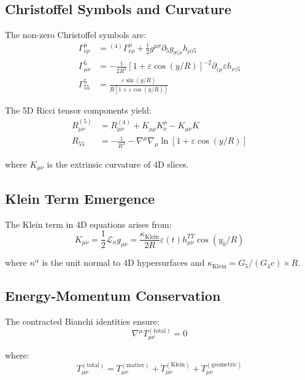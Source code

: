 \documentclass[12pt]{iopart}
\begin{document}
\subsection{Christoffel Symbols and Curvature}

The non-zero Christoffel symbols are:
\begin{align}
\Gamma^\mu_{\nu\rho} &= {}^{(4)}\Gamma^\mu_{\nu\rho} + \frac{1}{2}g^{\mu\sigma}\partial_5 g_{\sigma(\nu}h_{\rho)5}\\
\Gamma^5_{\mu\nu} &= -\frac{1}{2R^2}[1 + \varepsilon\cos(y/R)]^{-2}\partial_{(\mu}\varepsilon h_{\nu)5}\\
\Gamma^5_{55} &= \frac{\varepsilon\sin(y/R)}{R[1 + \varepsilon\cos(y/R)]}
\end{align}

The 5D Ricci tensor components yield:
\begin{align}
R_{\mu\nu}^{(5)} &= R_{\mu\nu}^{(4)} + K_{\mu\rho}K^\rho_\nu - K_{\mu\nu}K\\
R_{55} &= -\frac{1}{R^2} - \nabla^\mu\nabla_\mu\ln[1 + \varepsilon\cos(y/R)]
\end{align}

where $K_{\mu\nu}$ is the extrinsic curvature of 4D slices.

\subsection{Klein Term Emergence}

The Klein term in 4D equations arises from:
\begin{equation}
K_{\mu\nu} = \frac{1}{2}\mathcal{L}_n g_{\mu\nu} = \frac{\kappa_{\text{Klein}}}{2R}\varepsilon(t) h_{\mu\nu}^{TT}\cos(y_0/R)
\end{equation}

where $n^\alpha$ is the unit normal to 4D hypersurfaces and $\kappa_{\text{Klein}} = G_5/(G_4 c) \times R$.

\subsection{Energy-Momentum Conservation}

The contracted Bianchi identities ensure:
\begin{equation}
\nabla^\mu T_{\mu\nu}^{(\text{total})} = 0
\end{equation}

where:
\begin{equation}
T_{\mu\nu}^{(\text{total})} = T_{\mu\nu}^{(\text{matter})} + T_{\mu\nu}^{(\text{Klein})} + T_{\mu\nu}^{(\text{geometric})}
\end{equation}
\end{document}
